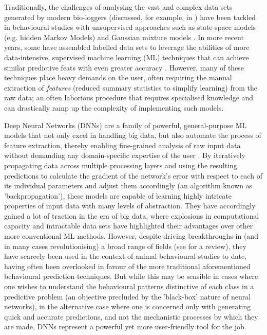 \documentclass[11pt]{article}
\begin{document}
    Traditionally, the challenges of analysing the vast and complex data sets generated by modern bio-loggers (discussed, for example, in \cite{urbano2010wildlife}) have been tackled in behavioural studies with unsupervised approaches such as state-space models (e.g. hidden Markov Models) and Gaussian mixture models \citep{rutz2009new,dean2013behavioural,jonsen2005robust,patterson2009classifying,breed2012state}. In more recent years, some have assembled labelled data sets to leverage the abilities of more data-intensive, supervised machine learning (ML) techniques that can achieve similar predictive feats with even greater accuracy \citep{guilford2009migration,nathan2012using,martiskainen2009cow,grunewalder2012movement,carroll2014supervised}. However, many of these techniques place heavy demands on the user, often requiring the manual extraction of \emph{features} (reduced summary statistics to simplify learning) from the raw data; an often laborious procedure that requires specialised knowledge and can drastically ramp up the complexity of implementing such models.
    
    Deep Neural Networks (DNNs) are a family of powerful, general-purpose ML models that not only excel in handling big data, but also automate the process of feature extraction, thereby enabling fine-grained analysis of raw input data without demanding any domain-specific expertise of the user \citep{bishop1995neural}. By iteratively propagating data across multiple processing layers and using the resulting predictions to calculate the gradient of the network's error with respect to each of its individual parameters and adjust them accordingly (an algorithm known as 'backpropagation'), these models are capable of learning highly intricate properties of input data with many levels of abstraction. They have accordingly gained a lot of traction in the era of big data, where explosions in computational capacity and intractable data sets have highlighted their advantages over other more conventional ML methods. However, despite driving breakthroughs in (and in many cases revolutionising) a broad range of fields (see \cite{lecun2015deep} for a review), they have scarcely been used in the context of animal behavioural studies to date, having often been overlooked in favour of the more traditional aforementioned behavioural prediction techniques. But while this may be sensible in cases where one wishes to understand the behavioural patterns distinctive of each class in a predictive problem (an objective precluded by the 'black-box' nature of neural networks), in the alternative case where one is concerned only with generating quick and accurate predictions, and not the mechanistic processes by which they are made, DNNs represent a powerful yet more user-friendly tool for the job.
    
\end{document}
